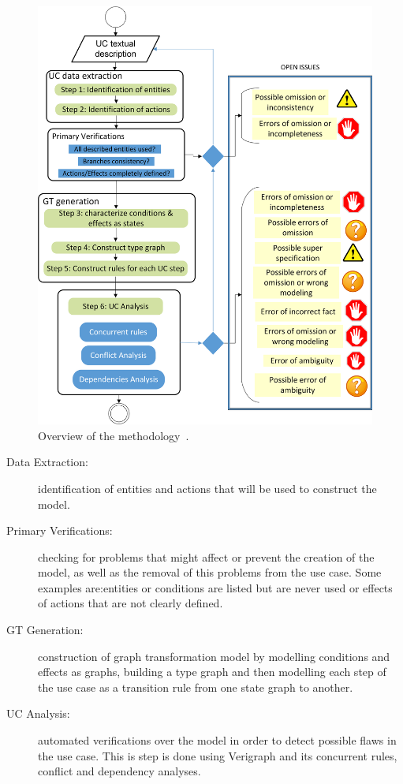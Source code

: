 \begin{figure}[!ht]
  \centering
  \includegraphics[scale=0.7]{images/generating-tests/methodology}
  \caption{Overview of the methodology~\cite{Junior2015}.}\label{fig:tests:methodology}
\end{figure}

\begin{description}
  \item[Data Extraction:] identification of entities and actions that will be used to construct the model.

  \item[Primary Verifications:] checking for problems that might affect or prevent the creation of the model, as well as the removal of this problems from the use case. Some examples are:entities or conditions are listed but are never used or effects of actions that are not clearly defined.

  \item[GT Generation:] construction of graph transformation model by modelling conditions and effects as graphs, building a type graph and then modelling each step of the use case as a transition rule from one state graph to another.

  \item[UC Analysis:] automated verifications over the model in order to detect possible flaws in the use case. This is step is done using Verigraph and its concurrent rules, conflict and dependency analyses.
\end{description}

